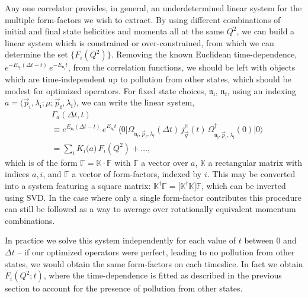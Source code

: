 \documentclass[twocolumn,amsmath,amssymb,prd,10pt,floatfix, 
superscriptaddress,nofootinbib, showpacs, preprintnumbers]{revtex4-1}
\begin{document}
Any one correlator provides, in general, an underdetermined linear system for the multiple form-factors we wish to extract. By using different combinations of initial and final state helicities and momenta all at the same $Q^2$, we can build a linear system which is constrained or over-constrained, from which we can determine the set $\{ F_i(Q^2) \}$. Removing the known Euclidean time-dependence, $e^{-E_{\mathfrak{n}_\mathrm{f}}(\Delta t - t)} \,  e^{-E_{\mathfrak{n}_\mathrm{i}}t} $, from the correlation functions, we should be left with objects which are time-independent up to pollution from other states, which should be modest for optimized operators. For fixed state choices, $\mathfrak{n}_\mathrm{i}, \, \mathfrak{n}_\mathrm{f}$, using an indexing $a = \big(\vec{p}_\mathrm{i}, \lambda_\mathrm{i}; \mu; \vec{p}_\mathrm{f}, \lambda_\mathrm{f}\big)$, we can write the linear system,
\begin{align}
&\Gamma_a(\Delta t, t) \nonumber 
\\ &\equiv e^{E_{\mathfrak{n}_\mathrm{f}}(\Delta t - t)} \,  e^{E_{\mathfrak{n}_\mathrm{i}}t} \, \big\langle 0 \big| \Omega^{\,}_{\mathfrak{n}_\mathrm{f},\vec{p}_\mathrm{f}, \lambda_\mathrm{f}}(\Delta t) \, j^\mu_{\vec{q}}(t) \, \Omega^\dag_{\mathfrak{n}_\mathrm{i},\vec{p}_\mathrm{i}, \lambda_\mathrm{i}}(0) \big| 0 \big\rangle\nonumber \\
 &= \sum\nolimits_i K_i\big(a \big) \, F_i(Q^2) + \ldots, \label{eqn::linear_system}
\end{align}
which is of the form $\mathbb{\Gamma} = \mathbb{K} \cdot \mathbb{F}$ with $\mathbb{\Gamma}$ a vector over $a$, $\mathbb{K}$ a rectangular matrix with indices $a,i$, and $\mathbb{F}$ a vector of form-factors, indexed by $i$. This may be converted into a system featuring a square matrix: $ \mathbb{K}^\dag \mathbb{\Gamma} = \Big[ \mathbb{K}^\dag \mathbb{K} \Big] \mathbb{F}$, which can be inverted using SVD. In the case where only a single form-factor contributes this procedure can still be followed as a way to average over rotationally equivalent momentum combinations.

In practice we solve this system independently for each value of $t$ between $0$ and $\Delta t$ -- if our optimized operators were perfect, leading to no pollution from other states, we would obtain the same form-factors on each timeslice. In fact we obtain $F_i(Q^2; t)$, where the time-dependence is fitted as described in the previous section to account for the presence of pollution from other states. 
\end{document}
